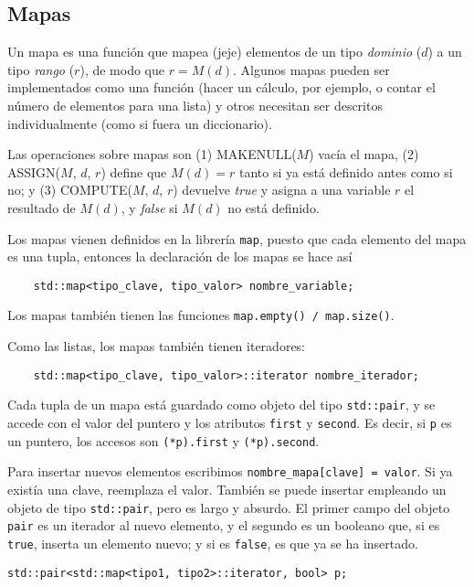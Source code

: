 \documentclass[a4paper]{article}
\begin{document}
	\subsection{Mapas}
	Un mapa es una función que mapea (jeje) elementos de un tipo \textit{dominio} ($d$) a un tipo \textit{rango} ($r$), de modo que $r = M(d)$. Algunos mapas pueden ser implementados como una función (hacer un cálculo, por ejemplo, o contar el número de elementos para una lista) y otros necesitan ser descritos individualmente (como si fuera un diccionario). 
	
	Las operaciones sobre mapas son (1) MAKENULL($M$) vacía el mapa, (2) ASSIGN($M$, $d$, $r$) define que $M(d) = r$ tanto si ya está definido antes como si no; y (3) COMPUTE($M$, $d$, $r$) devuelve \textit{true} y asigna a una variable $r$ el resultado de $M(d)$, y \textit{false} si $M(d)$ no está definido.
	
	Los mapas vienen definidos en la librería  \verb|map|, puesto que cada elemento del mapa es una tupla, entonces la declaración de los mapas se hace así
	
	\begin{verbatim}
	std::map<tipo_clave, tipo_valor> nombre_variable;
	\end{verbatim}
	
	Los mapas también tienen las funciones \verb|map.empty() / map.size()|.
	
	Como las listas, los mapas también tienen iteradores:
	
	\begin{verbatim}
	std::map<tipo_clave, tipo_valor>::iterator nombre_iterador;
	\end{verbatim}
	
	Cada tupla de un mapa está guardado como objeto del tipo \verb|std::pair|, y se accede con el valor del puntero y los atributos \verb|first| y \verb|second|. Es decir, si \verb|p| es un puntero, los accesos son \verb|(*p).first| y \verb|(*p).second|.
	
	Para insertar nuevos elementos escribimos \verb|nombre_mapa[clave] = valor|. Si ya existía una clave, reemplaza el valor. También se puede insertar empleando un objeto de tipo \verb|std::pair|, pero es largo y absurdo. El primer campo del objeto \verb|pair| es un iterador al nuevo elemento, y el segundo es un booleano que, si es \verb|true|, inserta un elemento nuevo; y si es \verb|false|, es que ya se ha insertado.
	
	\verb|std::pair<std::map<tipo1, tipo2>::iterator, bool> p;|
\end{document}
